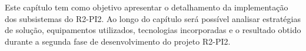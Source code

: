 
Este capítulo tem como objetivo apresentar o detalhamento da implementação dos subsistemas do R2-PI2. Ao longo do capítulo será possível analisar estratégias de solução, equipamentos utilizados, tecnologias incorporadas e o resultado obtido durante a segunda fase de desenvolvimento do projeto R2-PI2.

% 





% 















